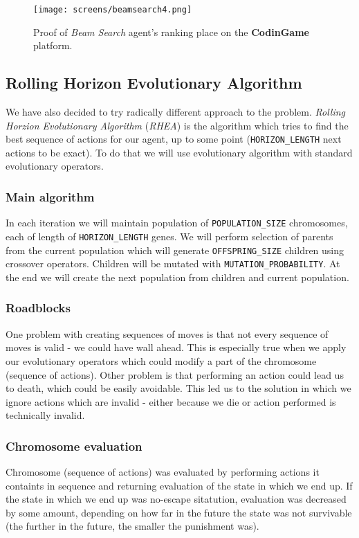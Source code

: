\documentclass[11pt]{article}
\begin{document}
    \begin{figure}[H]
 	    \centering
    	\texttt{[image: screens/beamsearch4.png]} 	
	    \caption{Proof of \textit{Beam Search} agent's ranking place on the \textbf{CodinGame} platform.}
 	\end{figure}
    
    \subsection{Rolling Horizon Evolutionary Algorithm}
    We have also decided to try radically different approach to the problem. \textit{Rolling Horzion Evolutionary Algorithm} (\textit{RHEA}) is the algorithm which tries to find the best sequence of actions for our agent, up to some point (\texttt{HORIZON\_LENGTH} next actions to be exact). To do that we will use evolutionary algorithm with standard evolutionary operators.
    
    \subsubsection*{Main algorithm}
    In each iteration we will maintain population of \texttt{POPULATION\_SIZE} chromosomes, each of length of \texttt{HORIZON\_LENGTH} genes. We will perform selection of parents from the current population which will generate \texttt{OFFSPRING\_SIZE} children using crossover operators. Children will be mutated with \texttt{MUTATION\_PROBABILITY}. At the end we will create the next population from children and current population.   
    
    \subsubsection*{Roadblocks}
    One problem with creating sequences of moves is that not every sequence of moves is valid - we could have wall ahead. This is especially true when we apply our evolutionary operators which could modify a part of the chromosome (sequence of actions). Other problem is that performing an action could lead us to death, which could be easily avoidable. This led us to the solution in which we ignore actions which are invalid - either because we die or action performed is technically invalid.
    
    \subsubsection*{Chromosome evaluation}
    Chromosome (sequence of actions) was evaluated by performing actions it containts in sequence and returning evaluation of the state in which we end up. If the state in which we end up was no-escape sitatution, evaluation was decreased by some amount, depending on how far in the future the state was not survivable (the further in the future, the smaller the punishment was).
    
\end{document}
